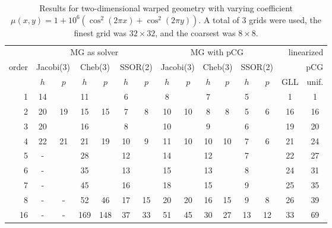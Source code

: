 \documentclass[smallcondensed,final]{svjour3}     %
\begin{document}
\begin{table}
  \caption{\label{tab:2d-fan} Results for two-dimensional warped geometry
    with varying coefficient $\mu(x,y) = 1 + 10^6(\cos^2(2\pi x) + \cos^2(2\pi y))$. 
		A total of 3 grids were used, the finest grid was $32\times 32$, and the coarsest was
    $8\times 8$.}
  \centering
  \begin{tabular}{|r|c c|c c|c c||c c|c c|c c||c c|} 
    \hline
    & \multicolumn{6}{c||}{MG as solver} & \multicolumn{6}{c||}{MG with pCG} & \multicolumn{2}{r|}{linearized} \\
    \cline{2-13}
    \!\!\! order \!\!\!\! &  \multicolumn{2}{c|}{\!\scriptsize  Jacobi(3)\!} &  \multicolumn{2}{c|}{\!\scriptsize Cheb(3)\!} & \multicolumn{2}{c||}{\!\scriptsize  SSOR(2)\!} & \multicolumn{2}{c|}{\!\scriptsize Jacobi(3)\!} &  \multicolumn{2}{c|}{\!\scriptsize Cheb(3)\!} & \multicolumn{2}{c||}{\!\scriptsize SSOR(2)\!} & \multicolumn{2}{r|}{pCG}\\
\hline
 & $h$ & $p$ & $h$ & $p$& $h$ & $p$& $h$ & $p$& $h$ & $p$& $h$ & $p$& GLL & unif.\\
 \cline{2-15}
1 & 14 & & 11 & & 6 & & 8 & & 7 & & 5 & & 1 & 1  \\
2 & 20 & 19 & 15 & 15 & 7 & 8 & 10 & 10 & 8 & 8 & 5 & 6 & 16 & 16 \\
3 & 20 & & 16 & & 8 & & 10 & & 9 & & 6 & & 19 & 20  \\
4 & 22 & 21 & 21 & 19 & 10 & 9 & 11 & 10 & 10 & 10 & 7 & 6 & 21 & 24 \\
5 & -  & & 28 & & 12 & & 14 & & 12 & & 7 & & 22 & 27  \\
6 & -  & & 35 & & 13 & & 15 & & 13 & & 8 & & 24 & 31  \\
7 & -  & & 45 & & 16 & & 18 & & 15 & & 9 & & 25 & 35  \\
8 & -  & - & 52 & 46 & 17 & 15 & 20 & 20 & 16 & 15 & 9 & 8 & 26 & 39 \\
16 & - & - & 169 & 148 & 37 & 33 & 51 & 45 & 30 & 27 & 13 & 12 & 33 & 69 \\
\hline
  \end{tabular}
\end{table}
\end{document}

